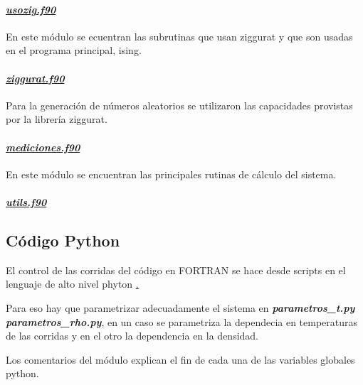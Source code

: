 \paragraph{\underline{\textit{usozig.f90}}} 
En este m\'odulo se ecuentran las subrutinas que usan ziggurat y que
son usadas en el programa principal, ising.
					
\paragraph{\underline{\textit{ziggurat.f90}}}

Para la generaci\'on de n\'umeros aleatorios se utilizaron
las capacidades provistas por la librer\'ia ziggurat. 

\paragraph{\underline{\textit{mediciones.f90}}} 
En este m\'odulo  se encuentran las principales rutinas de c\'alculo del
sistema.

\paragraph{\underline{\textit{utils.f90}}}



\subsection{Código Python}

El control de las corridas del código en FORTRAN se hace desde scripts en el lenguaje
de alto nivel phyton \href{http://www.python.org/}. 

Para eso hay que parametrizar adecuadamente el sistema en \textbf{\textit{parametros\_t.py}}
\textbf{\textit{parametros\_rho.py}}, en un caso se parametriza la dependecia en temperaturas
de las corridas y en el otro la dependencia en la densidad.
 
Los comentarios del módulo explican el fin de cada una de las variables globales python.

